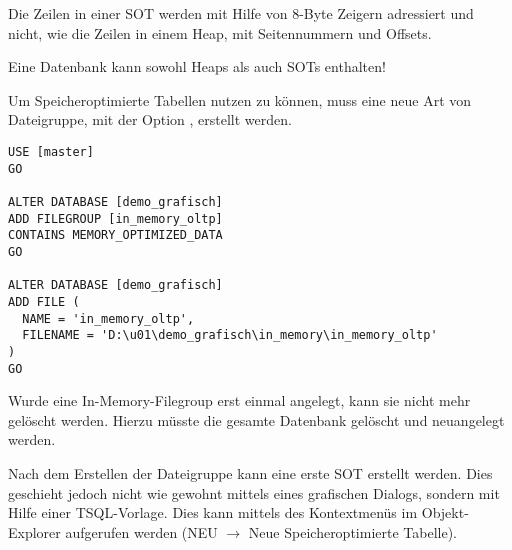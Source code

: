           Die Zeilen in einer SOT werden mit Hilfe von 8-Byte Zeigern adressiert
          und nicht, wie die Zeilen in einem Heap, mit Seitennummern und Offsets.
          \begin{merke}
            Eine Datenbank kann sowohl Heaps als auch SOTs enthalten!
          \end{merke}
          Um Speicheroptimierte Tabellen nutzen zu können, muss eine neue Art
          von Dateigruppe, mit der Option , erstellt werden.
          \begin{lstlisting}[language=ms_sql, caption={Erstellen einer
          In-Memory Dateigruppe}, label=admin05_04]
USE [master]
GO

ALTER DATABASE [demo_grafisch] 
ADD FILEGROUP [in_memory_oltp]
CONTAINS MEMORY_OPTIMIZED_DATA 
GO

ALTER DATABASE [demo_grafisch]
ADD FILE (
  NAME = 'in_memory_oltp',
  FILENAME = 'D:\u01\demo_grafisch\in_memory\in_memory_oltp'
)
GO
          \end{lstlisting}
          \begin{merke}
            Wurde eine In-Memory-Filegroup erst einmal angelegt, kann sie nicht
            mehr gelöscht werden. Hierzu müsste die gesamte Datenbank gelöscht
            und neuangelegt werden.
          \end{merke}
          Nach dem Erstellen der Dateigruppe kann eine erste SOT erstellt
          werden. Dies geschieht jedoch nicht wie gewohnt mittels eines
          grafischen Dialogs, sondern mit Hilfe einer TSQL-Vorlage. Dies kann
          mittels des Kontextmenüs im Objekt-Explorer aufgerufen werden (NEU
          $\rightarrow$ Neue Speicheroptimierte Tabelle).
\clearpage
